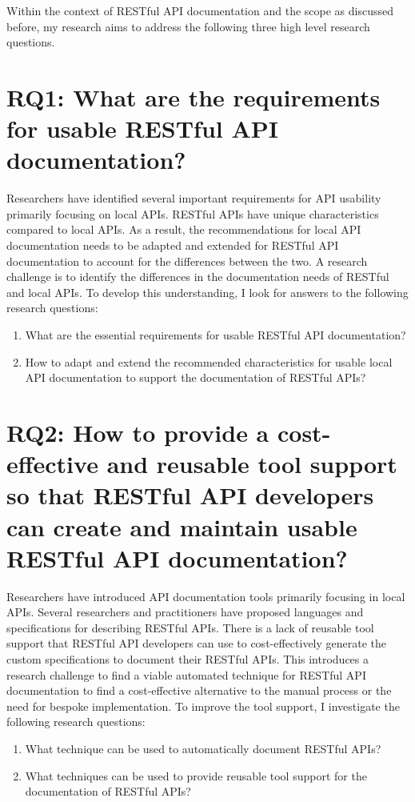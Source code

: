 \documentclass[11pt,oneside]{book}
\begin{document}
Within the context of RESTful API documentation and the scope as discussed before, my research aims to address the following three high level research questions.

\section{RQ1: What are the requirements for usable RESTful API documentation?
}

Researchers have identified several important requirements for API usability primarily focusing on local APIs. RESTful APIs have unique characteristics compared to local APIs. As a result, the recommendations for local API documentation needs to be adapted and extended for RESTful API documentation to account for the differences between the two. A research challenge is to identify the differences in the documentation needs of RESTful and local APIs. To develop this understanding, I look for answers to the following research questions:

\begin{enumerate}
  \item What are the essential requirements for usable RESTful API documentation?
  \item How to adapt and extend the recommended characteristics for usable local API documentation to support the documentation of RESTful APIs?
\end{enumerate}

\section{RQ2: How to provide a cost-effective and reusable tool support so that RESTful API developers can create and maintain usable RESTful API documentation?
} %

Researchers have introduced API documentation tools primarily focusing in local APIs. Several researchers and practitioners have proposed languages and specifications for describing RESTful APIs. There is a lack of reusable tool support that RESTful API developers can use to cost-effectively generate the custom specifications to document their RESTful APIs. This introduces a research challenge to find a viable automated technique for RESTful API documentation to find a cost-effective alternative to the manual process or the need for bespoke implementation. To improve the tool support, I investigate the following research questions:

\begin{enumerate}
  \item What technique can be used to automatically document RESTful APIs?
  \item What techniques can be used to provide reusable tool support for the documentation of RESTful APIs?
\end{enumerate}
\end{document}
